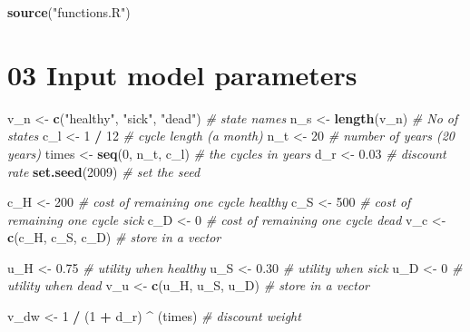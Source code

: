 \documentclass[
]{article}
\newenvironment{Shaded}{\begin{snugshade}}{\end{snugshade}}
\newcommand{\CommentTok}[1]{\textcolor[rgb]{0.56,0.35,0.01}{\textit{#1}}}
\newcommand{\DecValTok}[1]{\textcolor[rgb]{0.00,0.00,0.81}{#1}}
\newcommand{\FloatTok}[1]{\textcolor[rgb]{0.00,0.00,0.81}{#1}}
\newcommand{\KeywordTok}[1]{\textcolor[rgb]{0.13,0.29,0.53}{\textbf{#1}}}
\newcommand{\NormalTok}[1]{#1}
\newcommand{\OperatorTok}[1]{\textcolor[rgb]{0.81,0.36,0.00}{\textbf{#1}}}
\newcommand{\StringTok}[1]{\textcolor[rgb]{0.31,0.60,0.02}{#1}}
\begin{document}
\begin{Shaded}
\begin{Highlighting}[]
\KeywordTok{source}\NormalTok{(}\StringTok{"functions.R"}\NormalTok{)}
\end{Highlighting}
\end{Shaded}

\hypertarget{input-model-parameters}{%
\section{03 Input model parameters}\label{input-model-parameters}}

\begin{Shaded}
\begin{Highlighting}[]
\NormalTok{v_n       <-}\StringTok{ }\KeywordTok{c}\NormalTok{(}\StringTok{"healthy"}\NormalTok{, }\StringTok{"sick"}\NormalTok{, }\StringTok{"dead"}\NormalTok{)  }\CommentTok{# state names}
\NormalTok{n_s       <-}\StringTok{ }\KeywordTok{length}\NormalTok{(v_n)                   }\CommentTok{# No of states }
\NormalTok{c_l       <-}\StringTok{ }\DecValTok{1} \OperatorTok{/}\StringTok{ }\DecValTok{12}                        \CommentTok{# cycle length (a month)}
\NormalTok{n_t       <-}\StringTok{ }\DecValTok{20}                            \CommentTok{# number of years (20 years)}
\NormalTok{times     <-}\StringTok{ }\KeywordTok{seq}\NormalTok{(}\DecValTok{0}\NormalTok{, n_t, c_l)              }\CommentTok{# the cycles in years}
\NormalTok{d_r       <-}\StringTok{ }\FloatTok{0.03}                          \CommentTok{# discount rate}
\KeywordTok{set.seed}\NormalTok{(}\DecValTok{2009}\NormalTok{)                             }\CommentTok{# set the seed}

\NormalTok{c_H       <-}\StringTok{ }\DecValTok{200}                           \CommentTok{# cost of remaining one cycle healthy}
\NormalTok{c_S       <-}\StringTok{ }\DecValTok{500}                           \CommentTok{# cost of remaining one cycle sick}
\NormalTok{c_D       <-}\StringTok{ }\DecValTok{0}                             \CommentTok{# cost of remaining one cycle dead}
\NormalTok{v_c       <-}\StringTok{ }\KeywordTok{c}\NormalTok{(c_H, c_S, c_D)              }\CommentTok{# store in a vector}

\NormalTok{u_H       <-}\StringTok{ }\FloatTok{0.75}                          \CommentTok{# utility when healthy }
\NormalTok{u_S       <-}\StringTok{ }\FloatTok{0.30}                          \CommentTok{# utility when sick}
\NormalTok{u_D       <-}\StringTok{ }\DecValTok{0}                             \CommentTok{# utility when dead}
\NormalTok{v_u       <-}\StringTok{ }\KeywordTok{c}\NormalTok{(u_H, u_S, u_D)              }\CommentTok{# store in a vector}

\NormalTok{v_dw      <-}\StringTok{ }\DecValTok{1} \OperatorTok{/}\StringTok{ }\NormalTok{(}\DecValTok{1} \OperatorTok{+}\StringTok{ }\NormalTok{d_r) }\OperatorTok{^}\StringTok{ }\NormalTok{(times)       }\CommentTok{# discount weight }
\end{Highlighting}
\end{Shaded}
\end{document}
